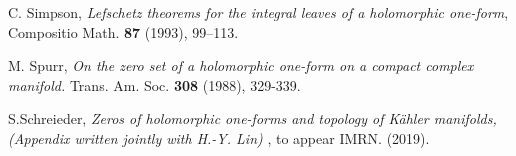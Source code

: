 \documentclass[a4paper,12pt,reqno]{amsart}
\theoremstyle{plain}
\theoremstyle{remark}
\begin{document}
\begin{thebibliography}{HKLR}
 C. Simpson, \textit{Lefschetz theorems for the integral leaves of a holomorphic one-form}, Compositio Math. \textbf{87} (1993), 99--113.

 M. Spurr, {\it On the zero set of a holomorphic one-form on a compact complex manifold.} Trans. Am.
Soc. \textbf{308} (1988), 329-339. 


 S.Schreieder, \textit{Zeros of holomorphic one-forms and topology of K\"ahler manifolds, (Appendix written jointly with H.-Y. Lin) }, to appear IMRN. (2019).


\end{thebibliography}
\end{document}
